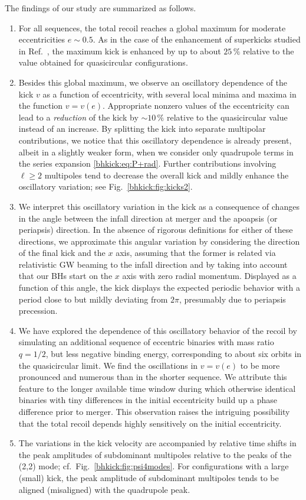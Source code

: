 The findings of our study are summarized as follows.
%
\begin{enumerate}
 \item For all sequences, the total recoil reaches
 a global maximum for moderate eccentricities $e \sim 0.5$.
 As in the case of the enhancement of superkicks studied
 in Ref.~\cite{Sperhake:2019wwo}, the maximum kick is
 enhanced by up to about $25\,\%$ relative to the value obtained
 for quasicircular configurations.
\item Besides this global maximum, we observe an oscillatory
  dependence of the kick $v$ as a function of eccentricity, with
  several local minima and maxima in the function $v = v(e)$. Appropriate
  nonzero values of the eccentricity can lead to a
  {\it reduction} of the kick by $\sim 10\,\%$ relative to the quasicircular
  value instead of an increase. By
  splitting the kick into separate multipolar contributions, we notice
  that this oscillatory dependence is already present, albeit in a
  slightly weaker form, when we consider only quadrupole terms in the
  series expansion \eqref{bhkick:eq:P+rad}.  Further contributions involving
  $\ell \ge 2$ multipoles tend to decrease the overall kick and mildly
  enhance the oscillatory variation; see Fig.~\ref{bhkick:fig:kicks2}.
 \item We interpret this oscillatory variation in the kick
 as a consequence of changes in the angle between the infall
 direction at merger and the apoapsis (or periapsis)
 direction. In the absence of rigorous definitions for either
 of these directions, we approximate this angular variation
 by considering the direction of the final kick and the
 $x$ axis, assuming that the former is related via relativistic
 GW beaming to the infall direction and by taking into account
 that our BHs start on the $x$ axis with zero radial momentum.
 Displayed as a function of this angle, the kick displays
 the expected periodic behavior with a period close to but
 mildly deviating from $2\pi$, presumably due to periapsis
 precession.
 \item We have explored the dependence of this oscillatory behavior
 of the recoil by simulating an additional sequence of eccentric
 binaries with mass ratio $q=1/2$, but less negative binding energy,
 corresponding to about six orbits in the quasicircular limit. 
 We find the oscillations in $v=v(e)$ to be more pronounced
 and numerous than in the shorter sequence. We attribute this
 feature to the longer available time window during which otherwise
 identical binaries with tiny differences in the initial
 eccentricity build up a phase difference prior to merger.
 This observation raises the intriguing possibility that the
 total recoil depends highly sensitively on the initial eccentricity.
 \item The variations in the kick velocity are accompanied by
 relative time shifts in the peak amplitudes of subdominant
 multipoles relative to the peaks of the (2,2) mode;
 cf.~Fig.~\ref{bhkick:fig:psi4modes}. For configurations with a large (small)
 kick, the peak amplitude of subdominant multipoles tends to
 be aligned (misaligned) with the quadrupole peak.
\end{enumerate}
